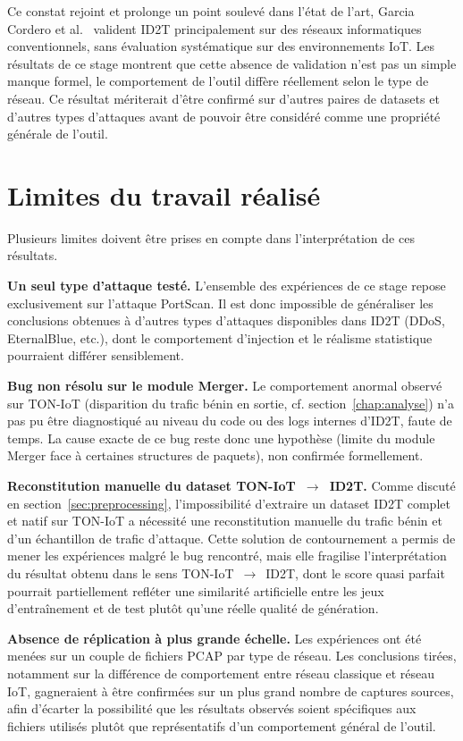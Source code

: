 \documentclass[12pt, a4paper]{report}
\begin{document}
Ce constat rejoint et prolonge un point soulevé dans l'état de l'art,
Garcia Cordero et al.~\cite{id2t2021} valident ID2T principalement sur
des réseaux informatiques conventionnels, sans évaluation systématique
sur des environnements IoT. Les résultats de ce stage montrent que
cette absence de validation n'est pas un simple manque formel, le
comportement de l'outil diffère réellement selon le type de réseau.
Ce résultat mériterait d'être confirmé sur d'autres paires de
datasets et d'autres types d'attaques avant de pouvoir être
considéré comme une propriété générale de l'outil.
 
\section{Limites du travail réalisé}
 
Plusieurs limites doivent être prises en compte dans l'interprétation
de ces résultats.
 
\textbf{Un seul type d'attaque testé.} L'ensemble des expériences de
ce stage repose exclusivement sur l'attaque PortScan. Il est donc
impossible de généraliser les conclusions obtenues à d'autres types
d'attaques disponibles dans ID2T (DDoS, EternalBlue, etc.), dont le
comportement d'injection et le réalisme statistique pourraient différer
sensiblement.
 
\textbf{Bug non résolu sur le module Merger.} Le comportement anormal
observé sur TON-IoT (disparition du trafic bénin en sortie, cf.
section~\ref{chap:analyse}) n'a pas pu être diagnostiqué au niveau du
code ou des logs internes d'ID2T, faute de temps. La cause exacte de
ce bug reste donc une hypothèse (limite du module Merger face à
certaines structures de paquets), non confirmée formellement.
 
\textbf{Reconstitution manuelle du dataset TON-IoT~$\rightarrow$~ID2T.}
Comme discuté en section~\ref{sec:preprocessing}, l'impossibilité
d'extraire un dataset ID2T complet et natif sur TON-IoT a nécessité
une reconstitution manuelle du trafic bénin et d'un échantillon de
trafic d'attaque. Cette solution de contournement a permis de mener
les expériences malgré le bug rencontré, mais elle fragilise
l'interprétation du résultat obtenu dans le sens
TON-IoT~$\rightarrow$~ID2T, dont le score quasi parfait pourrait
partiellement refléter une similarité artificielle entre les jeux
d'entraînement et de test plutôt qu'une réelle qualité de génération.
 
\textbf{Absence de réplication à plus grande échelle.} Les expériences
ont été menées sur un couple de fichiers PCAP par type de réseau. Les
conclusions tirées, notamment sur la différence de comportement entre
réseau classique et réseau IoT, gagneraient à être confirmées sur un
plus grand nombre de captures sources, afin d'écarter la possibilité
que les résultats observés soient spécifiques aux fichiers utilisés
plutôt que représentatifs d'un comportement général de l'outil.
 
\end{document}
